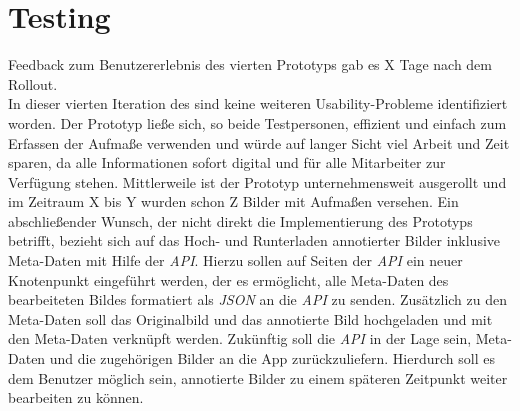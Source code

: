 \section{Testing}
Feedback zum Benutzererlebnis des vierten Prototyps gab es X Tage nach dem Rollout. \\

In dieser vierten Iteration des \hcdp{} sind keine weiteren Usability-Probleme identifiziert worden.
Der Prototyp ließe sich, so beide Testpersonen, effizient und einfach zum Erfassen der Aufmaße verwenden und würde auf langer Sicht viel Arbeit und Zeit sparen, da alle Informationen sofort digital und für alle Mitarbeiter zur Verfügung stehen.
Mittlerweile ist der Prototyp unternehmensweit ausgerollt und im Zeitraum X bis Y wurden schon Z Bilder mit Aufmaßen versehen. 
Ein abschließender Wunsch, der nicht direkt die Implementierung des Prototyps betrifft, bezieht sich auf das Hoch- und Runterladen annotierter Bilder inklusive Meta-Daten mit Hilfe der \emph{API}.
Hierzu sollen auf Seiten der \emph{API} ein neuer Knotenpunkt eingeführt werden, der es ermöglicht, alle Meta-Daten des bearbeiteten Bildes formatiert als \emph{JSON} an die \emph{API} zu senden.
Zusätzlich zu den Meta-Daten soll das Originalbild und das annotierte Bild hochgeladen und mit den Meta-Daten verknüpft werden.
Zukünftig soll die \emph{API} in der Lage sein, Meta-Daten und die zugehörigen Bilder an die App zurückzuliefern.
Hierdurch soll es dem Benutzer möglich sein, annotierte Bilder zu einem späteren Zeitpunkt weiter bearbeiten zu können.
